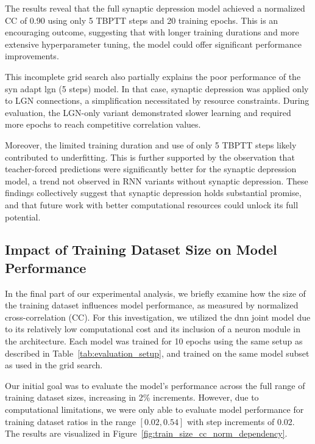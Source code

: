 The results reveal that the full synaptic depression model achieved a normalized CC of 0.90 using only 5 TBPTT steps and 20 training epochs. This is an encouraging outcome, suggesting that with longer training durations and more extensive hyperparameter tuning, the model could offer significant performance improvements.

This incomplete grid search also partially explains the poor performance of the syn adapt lgn (5 steps) model. In that case, synaptic depression was applied only to LGN connections, a simplification necessitated by resource constraints. During evaluation, the LGN-only variant demonstrated slower learning and required more epochs to reach competitive correlation values.

Moreover, the limited training duration and use of only 5 TBPTT steps likely contributed to underfitting. This is further supported by the observation that teacher-forced predictions were significantly better for the synaptic depression model, a trend not observed in RNN variants without synaptic depression. These findings collectively suggest that synaptic depression holds substantial promise, and that future work with better computational resources could unlock its full potential.

\subsection{Impact of Training Dataset Size on Model Performance}
\label{subsec:train_size_dataset_depencdency}
In the final part of our experimental analysis, we briefly examine how the size of the training dataset influences model performance, as measured by normalized cross-correlation (CC). For this investigation, we utilized the dnn joint model due to its relatively low computational cost and its inclusion of a neuron module in the architecture. Each model was trained for 10 epochs using the same setup as described in Table~\ref{tab:evaluation_setup}, and trained on the same model subset as used in the grid search.

Our initial goal was to evaluate the model's performance across the full range of training dataset sizes, increasing in 2\% increments. However, due to computational limitations, we were only able to evaluate model performance for training dataset ratios in the range $[0.02, 0.54]$ with step increments of 0.02. The results are visualized in Figure~\ref{fig:train_size_cc_norm_dependency}.

